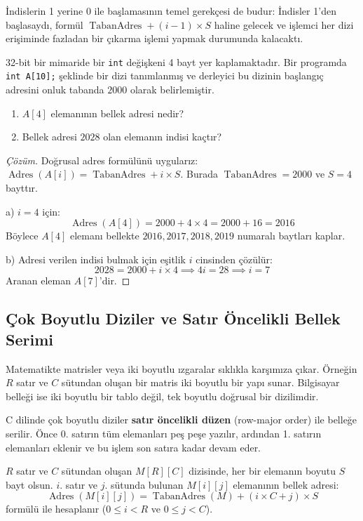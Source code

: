 İndislerin 1 yerine 0 ile başlamasının temel gerekçesi de budur: İndisler 1'den başlasaydı, formül $\operatorname{TabanAdres} + (i - 1) \times S$ haline gelecek ve işlemci her dizi erişiminde fazladan bir çıkarma işlemi yapmak durumunda kalacaktı.

\begin{example}
32-bit bir mimaride bir \texttt{int} değişkeni 4 bayt yer kaplamaktadır. Bir programda \texttt{int A[10];} şeklinde bir dizi tanımlanmış ve derleyici bu dizinin başlangıç adresini onluk tabanda $2000$ olarak belirlemiştir. 
\begin{enumerate}
    \item[a)] $A[4]$ elemanının bellek adresi nedir?
    \item[b)] Bellek adresi $2028$ olan elemanın indisi kaçtır?
\end{enumerate}
\end{example}

\begin{proof}[Çözüm]
Doğrusal adres formülünü uygularız: $\operatorname{Adres}(A[i]) = \operatorname{TabanAdres} + i \times S$. Burada $\operatorname{TabanAdres} = 2000$ ve $S = 4$ bayttır.

a) $i = 4$ için:
\[
\operatorname{Adres}(A[4]) = 2000 + 4 \times 4 = 2000 + 16 = 2016
\]
Böylece $A[4]$ elemanı bellekte $2016, 2017, 2018, 2019$ numaralı baytları kaplar.

b) Adresi verilen indisi bulmak için eşitlik $i$ cinsinden çözülür:
\[
2028 = 2000 + i \times 4 \implies 4i = 28 \implies i = 7
\]
Aranan eleman $A[7]$'dir.
\end{proof}

\subsection{Çok Boyutlu Diziler ve Satır Öncelikli Bellek Serimi}

Matematikte matrisler veya iki boyutlu ızgaralar sıklıkla karşımıza çıkar. Örneğin $R$ satır ve $C$ sütundan oluşan bir matris iki boyutlu bir yapı sunar. Bilgisayar belleği ise iki boyutlu bir tablo değil, tek boyutlu doğrusal bir dizilimdir.

C dilinde çok boyutlu diziler \textbf{satır öncelikli düzen} (row-major order) ile belleğe serilir. Önce 0. satırın tüm elemanları peş peşe yazılır, ardından 1. satırın elemanları eklenir ve bu işlem son satıra kadar devam eder.

\begin{theorem}
$R$ satır ve $C$ sütundan oluşan $M[R][C]$ dizisinde, her bir elemanın boyutu $S$ bayt olsun. $i$. satır ve $j$. sütunda bulunan $M[i][j]$ elemanının bellek adresi:
\[
\operatorname{Adres}(M[i][j]) = \operatorname{TabanAdres}(M) + (i \times C + j) \times S
\]
formülü ile hesaplanır ($0 \le i < R$ ve $0 \le j < C$).
\end{theorem}

